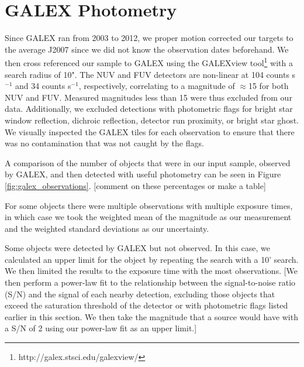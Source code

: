 \documentclass[twocolumn]{aastex62}
\begin{document}
\section{GALEX Photometry}\label{sec:photometry}




Since GALEX ran from 2003 to 2012, we proper motion corrected our targets to the average J2007 since we did not know the observation dates beforehand. We then cross referenced our sample to GALEX using the GALEXview tool\footnote{http://galex.stsci.edu/galexview/} with a search radius of 10". The NUV and FUV detectors are non-linear at 104 counts s$^{-1}$ and 34 counts s$^{-1}$, respectively, correlating to a magnitude of $\approx$15 for both NUV and FUV. Measured magnitudes less than 15 were thus excluded from our data. Additionally, we excluded detections with photometric flags for bright star window reflection, dichroic reflection, detector run proximity, or bright star ghost. We visually inspected the GALEX tiles for each observation to ensure that there was no contamination that was not caught by the flags. 






A comparison of the number of objects that were in our input sample, observed by GALEX, and then detected with useful photometry can be seen in Figure \ref{fig:galex_observations}. [comment on these percentages or make a table]

For some objects there were multiple observations with multiple exposure times, in which case we took the weighted mean of the magnitude as our measurement and the weighted standard deviations as our uncertainty.

Some objects were detected by GALEX but not observed. In this case, we calculated an upper limit for the object by repeating the search with a 10' search. We then limited the results to the exposure time with the most observations. [We then perform a power-law fit to the relationship between the signal-to-noise ratio (S/N) and the signal of each nearby detection, excluding those objects that exceed the saturation threshold of the detector or with photometric flags listed earlier in this section. We then take the magnitude that a source would have with a S/N of 2 using our power-law fit as an upper limit.]
\end{document}
